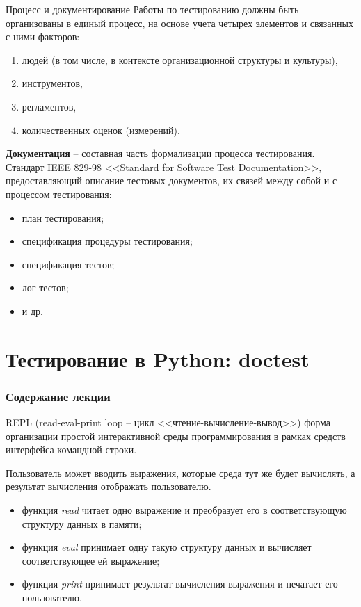 \documentclass[xcolor=table]{beamer}
\begin{document}
\begin{frame}{Процесс и документирование}
	Работы по тестированию должны быть организованы в единый процесс, на основе учета четырех элементов и связанных с ними факторов: 
	\begin{enumerate}
		\item людей (в том числе, в контексте организационной структуры и культуры),
		\item инструментов, 
		\item регламентов,
		\item количественных оценок (измерений). 
	\end{enumerate}
	
	\textbf{Документация} -- составная часть формализации процесса тестирования. 	Стандарт IEEE 829-98 <<Standard for Software Test Documentation>>, предоставляющий описание тестовых документов, их связей между собой и с процессом тестирования:
	\begin{itemize}
		\item план тестирования;
		\item спецификация процедуры тестирования;
		\item спецификация тестов;
		\item лог тестов;
		\item и др.	
	\end{itemize}	
\end{frame}

\section{Тестирование в Python: doctest}

\begin{frame}
  \frametitle{Содержание лекции}
  \tableofcontents[current]
\end{frame}

\begin{frame}
	\linespread{1.0}
	\begin{block}{REPL (read-eval-print loop -- цикл <<чтение-вычисление-вывод>>)}
		форма организации простой интерактивной среды программирования в рамках средств интерфейса командной строки.	
	\end{block}

	Пользователь может вводить выражения, которые среда тут же будет вычислять, а результат вычисления отображать пользователю. 
	\begin{itemize}
		\item функция \textit{read} читает одно выражение и преобразует его в соответствующую структуру данных в памяти;
		\item функция \textit{eval} принимает одну такую структуру данных и вычисляет соответствующее ей выражение;
		\item функция \textit{print} принимает результат вычисления выражения и печатает его пользователю.
	\end{itemize}
\end{frame}
\end{document}
